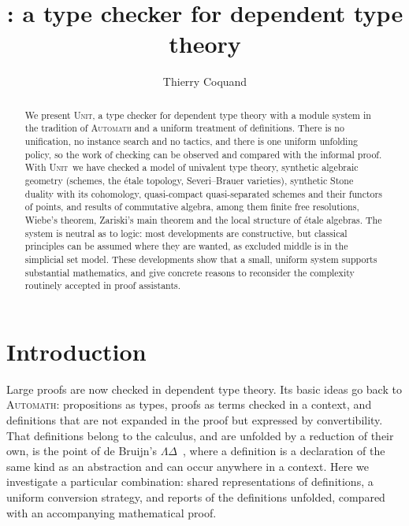 \documentclass[11pt]{article}
\title{\sys: a type checker for dependent type theory}
\author{Thierry Coquand}
\date{}
\newcommand{\sys}{\textsc{Unit}}
\begin{document}
\maketitle

\begin{abstract}
We present \sys, a type checker for dependent type theory with a module
system in the tradition of \textsc{Automath} and a uniform treatment of
definitions. There is no unification, no instance search and no
tactics, and there is one uniform unfolding policy, so the
work of checking can be observed and compared with the informal proof. With \sys\ we have
checked a model of univalent type theory, synthetic algebraic geometry
(schemes, the \'etale topology, Severi--Brauer varieties), synthetic Stone duality with its
cohomology, quasi-compact quasi-separated schemes and their functors of
points, and results of commutative algebra, among them
finite free resolutions, Wiebe's theorem, Zariski's main theorem and the
local structure of \'etale algebras. The system is neutral as to logic:
most developments are constructive, but classical principles can be
assumed where they are wanted, as excluded middle is in the simplicial
set model. These developments show that a small, uniform system
supports substantial mathematics, and give concrete reasons to
reconsider the complexity routinely accepted in proof assistants.
\end{abstract}

\section{Introduction}

Large proofs are now checked in dependent type theory. Its basic ideas
go back to \textsc{Automath}: propositions as types,
proofs as terms checked in a context, and definitions that are not
expanded in the proof but expressed by convertibility. That definitions
belong to the calculus, and are unfolded by a reduction of their own, is
the point of de Bruijn's $\Lambda\Delta$~\cite{LD}, where a definition is
a declaration of the same kind as an abstraction and can occur anywhere
in a context. Here we investigate a particular combination: shared
representations of definitions, a uniform conversion strategy, and
reports of the definitions unfolded, compared with an accompanying
mathematical proof.
\end{document}
